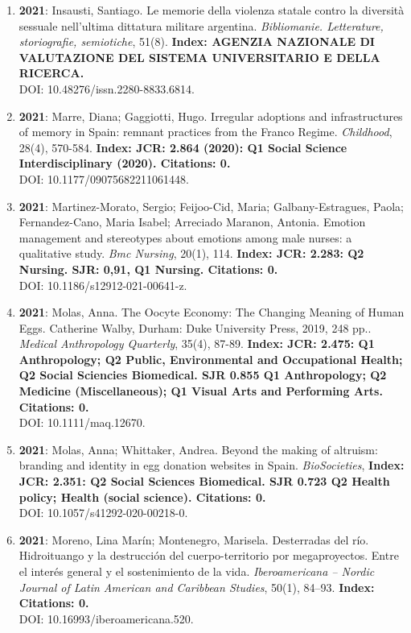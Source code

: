 \begin{enumerate}
\item {\bf 2021}: Insausti, Santiago.  Le memorie della violenza statale contro la diversità sessuale nell’ultima dittatura militare argentina. {\it Bibliomanie. Letterature, storiografie, semiotiche}, 51(8). {\bf Index: AGENZIA NAZIONALE DI VALUTAZIONE DEL SISTEMA UNIVERSITARIO E DELLA RICERCA. } \\ DOI: 10.48276/issn.2280-8833.6814. \filbreak
\item {\bf 2021}: Marre, Diana; Gaggiotti, Hugo.  Irregular adoptions and infrastructures of memory in Spain: remnant practices from the Franco Regime. {\it Childhood}, 28(4), 570-584. {\bf Index: JCR: 2.864 (2020): Q1 Social Science Interdisciplinary (2020).  Citations: 0. } \\ DOI: 10.1177/09075682211061448. \filbreak
\item {\bf 2021}: Martinez-Morato, Sergio; Feijoo-Cid, Maria; Galbany-Estragues, Paola; Fernandez-Cano, Maria Isabel; Arreciado Maranon, Antonia.  Emotion management and stereotypes about emotions among male nurses: a qualitative study. {\it Bmc Nursing}, 20(1), 114. {\bf Index: JCR: 2.283: Q2 Nursing.  SJR: 0,91, Q1 Nursing. Citations: 0. } \\ DOI: 10.1186/s12912-021-00641-z. \filbreak
\item {\bf 2021}: Molas, Anna.  The Oocyte Economy: The Changing Meaning of Human Eggs. Catherine Walby, Durham: Duke University Press, 2019, 248 pp.. {\it Medical Anthropology Quarterly}, 35(4), 87-89. {\bf Index: JCR: 2.475: Q1 Anthropology; Q2 Public, Environmental and Occupational Health; Q2 Social Sciencies Biomedical.  SJR 0.855 Q1 Anthropology; Q2 Medicine (Miscellaneous); Q1 Visual Arts and Performing Arts. Citations: 0. } \\ DOI: 10.1111/maq.12670. \filbreak
\item {\bf 2021}: Molas, Anna; Whittaker, Andrea.  Beyond the making of altruism: branding and identity in egg donation websites in Spain. {\it BioSocieties}, {\bf Index: JCR: 2.351: Q2 Social Sciences Biomedical.  SJR 0.723 Q2 Health policy; Health (social science). Citations: 0. } \\ DOI: 10.1057/s41292-020-00218-0. \filbreak
\item {\bf 2021}: Moreno, Lina Marín; Montenegro, Marisela.  Desterradas del río. Hidroituango y la destrucción del cuerpo-territorio por megaproyectos. Entre el interés general y el sostenimiento de la vida. {\it Iberoamericana – Nordic Journal of Latin American and Caribbean Studies}, 50(1), 84–93. {\bf Index: Citations: 0. } \\ DOI: 10.16993/iberoamericana.520. \filbreak

\end{enumerate}
